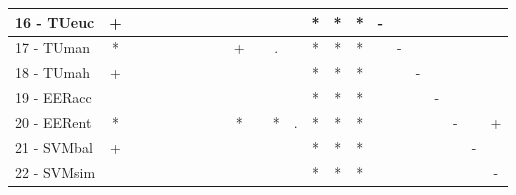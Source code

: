 \begin{table}[h]
\begin{center}
\begin{tabular}{lcc|cc|cc|cc|cc|cc|cc|cc|cc|cc|cc}
16 - TUeuc	& + &   &   &   &   &   &   &   &   &   &   &   & * & * & * & - &   &   &   &   &   &   \\ \hline
17 - TUman	& * &   &   &   &   &   &   &   & + &   & . &   & * & * & * &   & - &   &   &   &   &   \\
18 - TUmah	& + &   &   &   &   &   &   &   &   &   &   &   & * & * & * &   &   & - &   &   &   &   \\ \hline
19 - EERacc	&   &   &   &   &   &   &   &   &   &   &   &   & * & * & * &   &   &   & - &   &   &   \\
20 - EERent	& * &   &   &   &   &   &   &   & * &   & * & . & * & * & * &   &   &   &   & - &   & + \\ \hline
21 - SVMbal	& + &   &   &   &   &   &   &   &   &   &   &   & * & * & * &   &   &   &   &   & - &   \\
22 - SVMsim	&   &   &   &   &   &   &   &   &   &   &   &   & * & * & * &   &   &   &   &   &   & - \\ \hline\end{tabular}
\label{stratsfriedC4.5w}
\end{center}
\end{table}